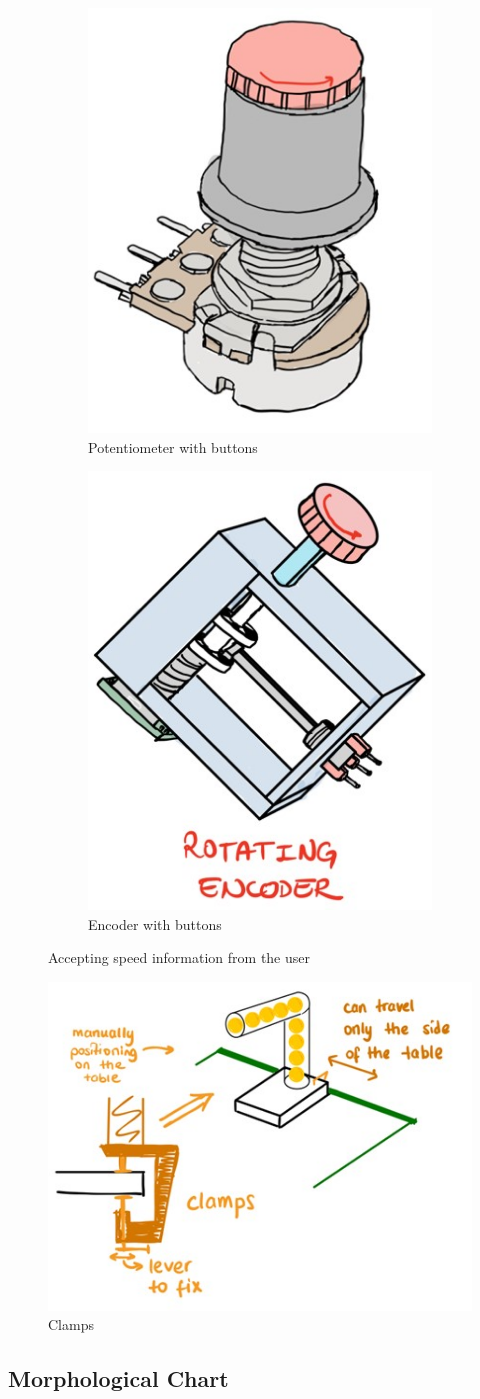 \documentclass[12pt]{report}
\begin{document}
\begin{appendices}
\begin{figure}[H]
\centering
\begin{subfigure}{.3\textwidth}
  \centering
  \includegraphics[width=.3\linewidth]{potentiometer.jpg}
  \caption{Potentiometer with buttons}
  \label{fig:pot}
\end{subfigure}%
\begin{subfigure}{.3\textwidth}
  \centering
  \includegraphics[width=.3\linewidth]{encoder.jpg}
  \caption{Encoder with buttons}
  \label{fig:encoder}
\end{subfigure}

\caption{Accepting speed information from the user}
\label{fig:accept_speed}
\end{figure}

\begin{figure}[H]
\centering

  \includegraphics[width=.2\linewidth]{clamps.jpg}
  \caption{Clamps}
  \label{fig:clamp}

\end{figure}

\subsection{Morphological Chart \label{app:morpho}}


\end{appendices}
\end{document}
